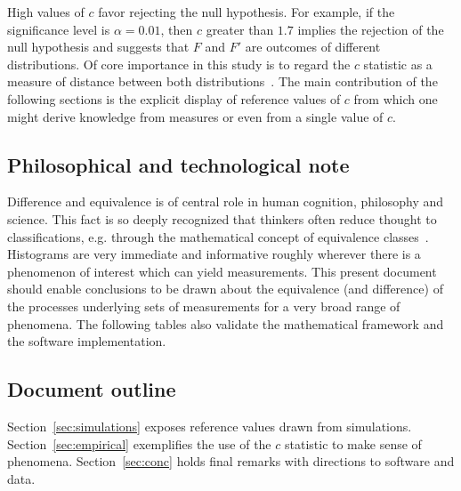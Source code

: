 \documentclass[%
	aip,
	jmp,%
	amsmath,amssymb,
	reprint,%
]{revtex4-1}
\begin{document}
High values of $c$ favor rejecting the null hypothesis.
For example, if the significance level is $\alpha=0.01$,
then $c$ greater than $1.7$
implies the rejection of the null hypothesis and
suggests that $F$ and $F'$
are outcomes of different distributions.
Of core importance in this study is to regard the $c$ statistic
as a measure of distance between both distributions~\cite{kolm}.
The main contribution of the following sections is the
explicit display of reference values of $c$
from which one might derive knowledge from
measures or even from a single value of $c$.

%
%


\subsection{Philosophical and technological note}
Difference and equivalence is of central role in human cognition,
philosophy and science.
This fact is so deeply recognized that thinkers often reduce
thought to classifications, e.g. through the
mathematical concept of equivalence classes~\cite{deleuze}.
Histograms are very immediate and informative
roughly wherever there is a phenomenon of interest which can yield measurements.
This present document should enable conclusions to be drawn about 
the equivalence (and difference)
of the processes underlying sets of measurements for a very
broad range of phenomena.
The following tables 
also validate the mathematical framework
and the software implementation.

\subsection{Document outline}
Section~\ref{sec:simulations} exposes reference values drawn from simulations.
Section~\ref{sec:empirical} exemplifies the use of the $c$ statistic
to make sense of phenomena.
Section~\ref{sec:conc} holds final remarks with directions to
software and data.
\end{document}
